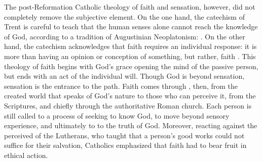 The post-Reformation Catholic theology of faith and sensation, however, did not
completely remove the subjective element.
On the one hand, the catechism of Trent is careful to teach that the human
senses alone cannot reach the knowledge of God, according to a tradition of
Augustinian Neoplatonism:
.%
    \Autocite
    [18: .]
    {Catholic:Catechismus1614}
On the other hand, the catechism acknowledges that faith requires an individual
response: it is more than having an opinion or conception of something, but
rather, faith .%
    \Autocite
    [15: .]
    {Catholic:Catechismus1614}
This theology of faith begins with God's grace opening the mind of the
passive person, but ends with an act of the individual will.
Though God is beyond sensation, sensation is the entrance to the path. 
Faith comes through , then, from the created world that
speaks of God's nature to those who can perceive it, from the Scriptures, and
chiefly through the authoritative Roman church.
Each person is still called to a process of seeking to know God, to move beyond
sensory experience, and ultimately to  to the truth of God.
Moreover, reacting against the perceived  of the Lutherans, who
taught that a person's good works could not suffice for their salvation,
Catholics emphasized that faith had to bear fruit in ethical action.

